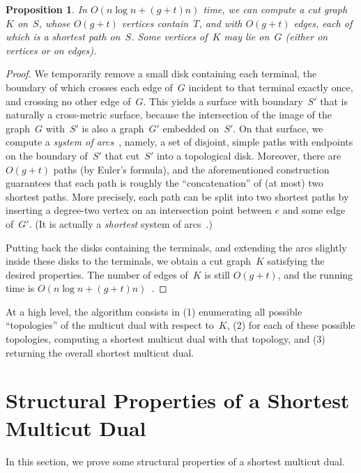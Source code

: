 \documentclass[11pt]{article}
\theoremstyle{plain}  \newtheorem{theorem}{Theorem}[section]
\newtheorem{proposition}[theorem]{Proposition}
\theoremstyle{definition}
\begin{document}
\begin{proposition}\label{P:cutgraph}
  In $O(n\log n+(g+t)n)$ time, we can compute a cut graph~$K$ on~$S$, whose
  $O(g+t)$ vertices contain~$T$, and with $O(g+t)$ edges, each of which is
  a shortest path on~$S$.  Some vertices of~$K$ may lie on~$G$ (either on
  vertices or on edges).
\end{proposition}
\begin{proof}
  We temporarily remove a small disk containing each terminal, the boundary
  of which crosses each edge of~$G$ incident to that terminal exactly once,
  and crossing no other edge of~$G$.  This yields a surface with
  boundary~$S'$ that is naturally a cross-metric surface, because the
  intersection of the image of the graph~$G$ with~$S'$ is also a graph~$G'$
  embedded on~$S'$.  On that surface, we compute a \emph{system of
    arcs}~\cite[Section~5.1]{ccelw-scsh-08}, namely, a set of disjoint,
  simple paths with endpoints on the boundary of~$S'$ that cut~$S'$ into a
  topological disk.  Moreover, there are $O(g+t)$ paths (by Euler's
  formula), and the aforementioned construction guarantees that each path
  is roughly the ``concatenation'' of (at most) two shortest paths.  More
  precisely, each path can be split into two shortest paths by inserting a
  degree-two vertex on an intersection point between $e$ and some edge
  of~$G'$.  (It is actually a \emph{shortest} system of
  arcs~\cite[Conclusion]{c-scgsp-10}.)

  Putting back the disks containing the terminals, and extending the arcs
  slightly inside these disks to the terminals, we obtain a cut graph~$K$
  satisfying the desired properties.  The number of edges of~$K$ is still
  $O(g+t)$, and the running time is
  $O(n\log n+(g+t)n)$~\cite{ccelw-scsh-08}.
\end{proof}

At a high level, the algorithm consists in (1) enumerating all possible
``topologies'' of the multicut dual with respect to~$K$, (2) for each of
these possible topologies, computing a shortest multicut dual with that
topology, and (3) returning the overall shortest multicut dual.

\section{Structural Properties of a Shortest Multicut Dual}\label{S:struct}

In this section, we prove some structural properties of a shortest multicut
dual.
\end{document}
